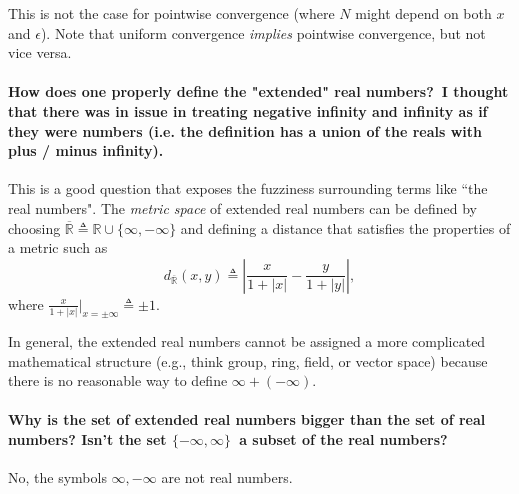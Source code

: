 \documentclass[10pt,english]{article}
\begin{document}
This is not the case for pointwise convergence (where $N$ might depend on both $x$ and $\epsilon$).
Note that uniform convergence \textit{implies} pointwise convergence, but not vice versa.


\paragraph{How does one properly define the "extended" real numbers? I thought that there was in issue in treating negative infinity and infinity as if they were numbers (i.e. the definition has a union of the reals with plus / minus infinity).}

This is a good question that exposes the fuzziness surrounding terms like ``the real numbers".
The \textit{metric space} of extended real numbers can be defined by choosing $\overline{\mathbb{R}} \triangleq \mathbb{R} \cup \{ \infty,-\infty\}$ and defining a distance that satisfies the properties of a metric such as
\[ d_{\overline{\mathbb{R}}} (x,y) \triangleq \left|\frac{x}{1+|x|} - \frac{y}{1+|y|} \right|, \]
where $\frac{x}{1+|x|}\big|_{x=\pm\infty} \triangleq \pm 1$.

In general, the extended real numbers cannot be assigned a more complicated mathematical structure (e.g., think group, ring, field, or vector space) because there is no reasonable way to define $\infty + (- \infty)$.

\paragraph{Why is the set of extended real numbers bigger than the set of real numbers? Isn't the set $\{-\infty, \infty\}$ a subset of the real numbers?}

No, the symbols $\infty,-\infty$ are not real numbers.
\end{document}
